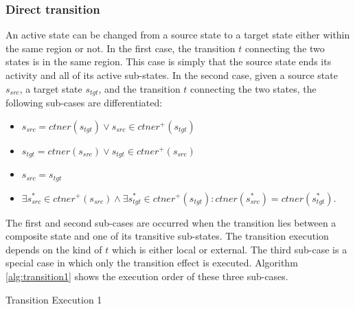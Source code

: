 \subsubsection{Direct transition}
An active state can be changed from a source state to a target state either within the same region or not. In the first case, the transition $t$ connecting the two states is in the same region. This case is simply that the source state ends its activity and all of its active sub-states. In the second case, given a source state $s_{src}$, a target state $s_{tgt}$, and the transition $t$ connecting the two states, the following sub-cases are differentiated:
\begin{itemize}
	\item $s_{src} = ctner(s_{tgt}) \vee s_{src} \in ctner^+(s_{tgt})$
	
	\item $s_{tgt} = ctner(s_{src}) \vee s_{tgt} \in ctner^+(s_{src})$
	
	\item $s_{src} = s_{tgt}$
	
	
	
	\item $\exists s_{src}^* \in ctner^+(s_{src}) \wedge \exists s_{tgt}^* \in ctner^+(s_{tgt}): ctner(s_{src}^*) = ctner(s_{tgt}^*)$.
\end{itemize}  

The first and second sub-cases are occurred when the transition lies between a composite state and one of its transitive sub-states. The transition execution depends on the kind of $t$ which is either local or external. The third sub-case is a special case in which only the transition effect is executed. Algorithm \ref{alg:transition1} shows the execution order of these three sub-cases. 

\begin{algorithm}[]
	\caption{Transition Execution 1
		\label{alg:transition1}}
	\begin{algorithmic}[1]

		\EndProcedure	
	\end{algorithmic}
\end{algorithm}

